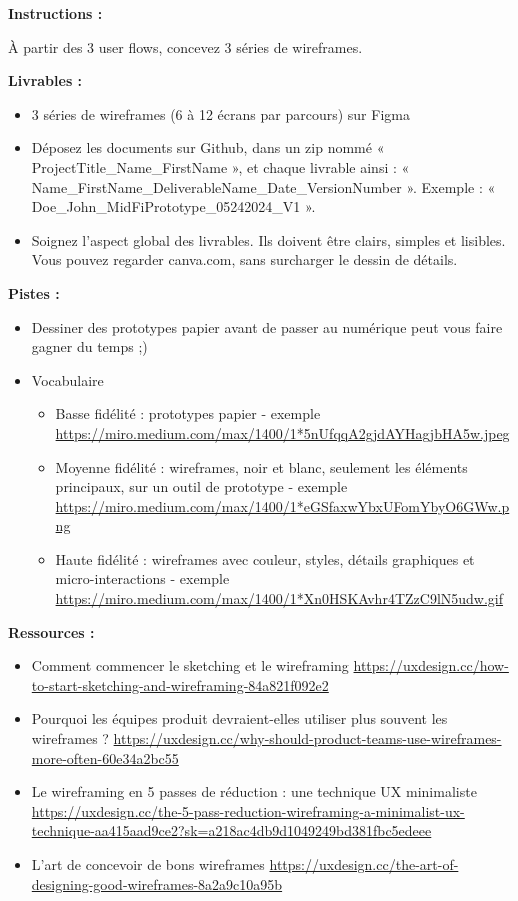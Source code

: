 \makeheaderfiles

\textbf{Instructions :}

À partir des 3 user flows, concevez 3 séries de wireframes.

\textbf{Livrables :}

\begin{itemize}
\item 3 séries de wireframes (6 à 12 écrans par parcours) sur Figma
\item Déposez les documents sur Github, dans un zip nommé « ProjectTitle\_Name\_FirstName », et chaque livrable ainsi : « Name\_FirstName\_DeliverableName\_Date\_VersionNumber ». Exemple : « Doe\_John\_MidFiPrototype\_05242024\_V1 ».
\item Soignez l'aspect global des livrables. Ils doivent être clairs, simples et lisibles. Vous pouvez regarder canva.com, sans surcharger le dessin de détails.
\end{itemize}

\textbf{Pistes :}

\begin{itemize}
\item Dessiner des prototypes papier avant de passer au numérique peut vous faire gagner du temps ;)
\item Vocabulaire
\begin{itemize}
\item Basse fidélité : prototypes papier - exemple \url{https://miro.medium.com/max/1400/1*5nUfqqA2gjdAYHagjbHA5w.jpeg}
\item Moyenne fidélité : wireframes, noir et blanc, seulement les éléments principaux, sur un outil de prototype - exemple \url{https://miro.medium.com/max/1400/1*eGSfaxwYbxUFomYbyO6GWw.png}
\item Haute fidélité : wireframes avec couleur, styles, détails graphiques et micro-interactions - exemple \url{https://miro.medium.com/max/1400/1*Xn0HSKAvhr4TZzC9lN5udw.gif}
\end{itemize}
\end{itemize}

\textbf{Ressources :}

\begin{itemize}
\item Comment commencer le sketching et le wireframing \url{https://uxdesign.cc/how-to-start-sketching-and-wireframing-84a821f092e2}
\item Pourquoi les équipes produit devraient-elles utiliser plus souvent les wireframes ? \url{https://uxdesign.cc/why-should-product-teams-use-wireframes-more-often-60e34a2bc55}
\item Le wireframing en 5 passes de réduction : une technique UX minimaliste \url{https://uxdesign.cc/the-5-pass-reduction-wireframing-a-minimalist-ux-technique-aa415aad9ce2?sk=a218ac4db9d1049249bd381fbc5edeee}
\item L'art de concevoir de bons wireframes \url{https://uxdesign.cc/the-art-of-designing-good-wireframes-8a2a9c10a95b}
\end{itemize}

